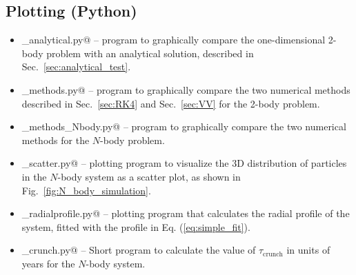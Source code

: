 \documentclass{article}
\begin{document}
\begin{multicols}{2}
\subsection{Plotting (Python)}

\begin{itemize}
	\item \verb@plotting_analytical.py@ -- program to graphically compare the one-dimensional 2-body problem with an analytical solution, described in Sec.~\ref{sec:analytical_test}.
	\item \verb@plot_methods.py@ -- program to graphically compare the two numerical methods described in Sec.~\ref{sec:RK4} and Sec.~\ref{sec:VV} for the 2-body problem.
	\item \verb@plot_methods_Nbody.py@ -- program to graphically compare the two numerical methods for the $N$-body problem.
	\item \verb@plotting_scatter.py@ -- plotting program to visualize the 3D distribution of particles in the $N$-body system as a scatter plot, as shown in Fig.~\ref{fig:N_body_simulation}. 
	\item \verb@plotting_radialprofile.py@ -- plotting program that calculates the radial profile of the system, fitted with the profile in Eq. (\ref{eq:simple_fit}). %
	\item \verb@t_crunch.py@ -- Short program to calculate the value of $\tau_{\mathrm{crunch}}$ in units of years for the $N$-body system.
\end{itemize}




\end{multicols}
\end{document}
